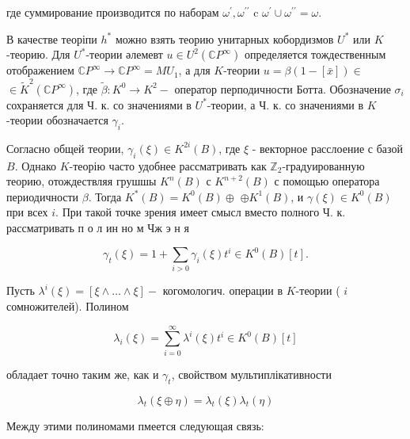 \documentclass[10pt]{article}
\begin{document}
где суммирование производится по наборам $\omega^{\prime}, \omega^{\prime \prime}$ c $\omega^{\prime} \cup \omega^{\prime \prime}=\omega$.



В качестве теоріпи $h^{*}$ можно взять теорию унитарных кобордизмов $U^{*}$ или $K$-теорию. Для $U^{*}$-теории әлемевт $u \in U^{2}\left(\mathbb{C} P^{\infty}\right)$ определяется тождественным отображением $\mathbb{C} P^{\infty} \longrightarrow \mathbb{C} P^{\infty}=M U_{1}$, а для $K$-теории $u=\beta(1-[\bar{x}]) \in$ $\in \tilde{K}^{2}\left(\mathbb{C} P^{\infty}\right)$, где $\tilde{\beta}: K^{0} \longrightarrow K^{2}-$ оператор перподичности Ботта. Обозначение $\sigma_{i}$ сохраняется для Ч. к. со значениями в $U^{*}$-теории, а Ч. к. со значениями в $K$-теории обозначается $\gamma_{i}$.



Согласно общей теории, $\gamma_{i}(\xi) \in K^{2 i}(B)$, где $\xi$ - векторное расслоение с базой $B$. Однако $K$-теорію часто удобнее рассматривать как $\mathbb{Z}_{2}$-градуированную теорию, отождествляя грушшы $K^{n}(B)$ с $K^{n+2}(B)$ с помощью оператора периодичности $\beta$. Тогда $K^{*}(B)=K^{0}(B) \oplus$ $\oplus K^{1}(B)$, и $\gamma(\xi) \in K^{0}(B)$ при всех $i$. При такой точке зрения имеет смысл вместо полного Ч. к. рассматривать п о л ин но м Чж э н я



\[

\gamma_{t}(\xi)=1+\sum_{i>0} \gamma_{i}(\xi) t^{i} \in K^{0}(B)[t] .

\]



Пусть $\lambda^{i}(\xi)=[\xi \wedge \ldots \wedge \xi]-$ когомологич. операции в $K$-теории ( $i$ сомножителей). Полином



\[

\lambda_{i}(\xi)=\sum_{i=0}^{\infty} \lambda^{i}(\xi) t^{i} \in K^{0}(B)[t]

\]



обладает точно таким же, как и $\gamma_{t}$, свойством мультиплікативности



\[

\lambda_{t}(\xi \oplus \eta)=\lambda_{t}(\xi) \lambda_{t}(\eta)

\]



Между этими полиномами пмеется следующая связь:
\end{document}
